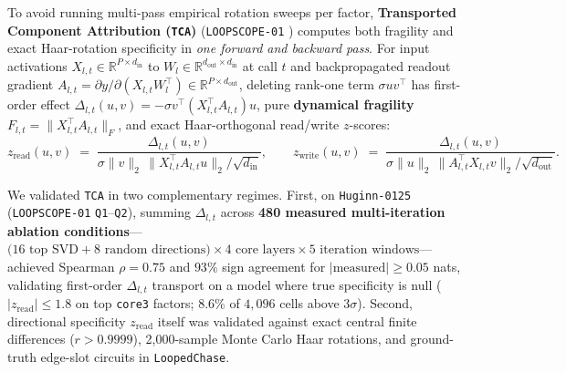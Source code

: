 \documentclass[10pt,letterpaper]{article}
\begin{document}
To avoid running multi-pass empirical rotation sweeps per factor, \textbf{Transported Component Attribution (\texttt{TCA})} (\texttt{LOOPSCOPE-01} \cite{dugan2026loopscope01}) computes both fragility and exact Haar-rotation specificity in \emph{one forward and backward pass}. For input activations $X_{l,t} \in \mathbb{R}^{P \times d_{\mathrm{in}}}$ to $W_l \in \mathbb{R}^{d_{\mathrm{out}} \times d_{\mathrm{in}}}$ at call $t$ and backpropagated readout gradient $A_{l,t} = \partial y / \partial (X_{l,t} W_l^\top) \in \mathbb{R}^{P \times d_{\mathrm{out}}}$, deleting rank-one term $\sigma u v^\top$ has first-order effect $\Delta_{l,t}(u,v) = -\sigma v^\top (X_{l,t}^\top A_{l,t}) u$, pure \textbf{dynamical fragility} $F_{l,t} = \|X_{l,t}^\top A_{l,t}\|_F$, and exact Haar-orthogonal read/write $z$-scores:
\begin{equation}
  z_{\mathrm{read}}(u,v) \;=\; \frac{\Delta_{l,t}(u,v)}{\sigma \|v\|_2 \, \|X_{l,t}^\top A_{l,t} u\|_2 / \sqrt{d_{\mathrm{in}}}},
  \qquad
  z_{\mathrm{write}}(u,v) \;=\; \frac{\Delta_{l,t}(u,v)}{\sigma \|u\|_2 \, \|A_{l,t}^\top X_{l,t} v\|_2 / \sqrt{d_{\mathrm{out}}}}.
  \label{eq:tca_z}
\end{equation}

We validated \texttt{TCA} in two complementary regimes. First, on \texttt{Huginn-0125} (\texttt{LOOPSCOPE-01} \texttt{Q1}--\texttt{Q2}), summing $\Delta_{l,t}$ across \textbf{480 measured multi-iteration ablation conditions}—$\bigl(16 \text{ top SVD} + 8 \text{ random directions}\bigr) \times 4 \text{ core layers} \times 5 \text{ iteration windows}$—achieved Spearman $\rho = 0.75$ and $93\%$ sign agreement for $|\text{measured}| \ge 0.05$ nats, validating first-order $\Delta_{l,t}$ transport on a model where true specificity is null ($|z_{\mathrm{read}}| \le 1.8$ on top \texttt{core3} factors; $8.6\%$ of $4{,}096$ cells above $3\sigma$). Second, directional specificity $z_{\mathrm{read}}$ itself was validated against exact central finite differences ($r > 0.9999$), 2,000-sample Monte Carlo Haar rotations, and ground-truth edge-slot circuits in \texttt{LoopedChase}.
\end{document}
